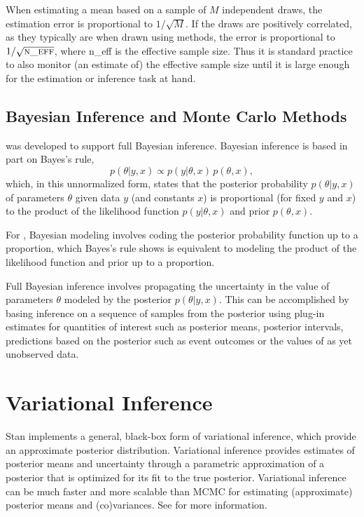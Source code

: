 When estimating a mean based on a sample of $M$ independent draws, the
estimation error is proportional to $1/\sqrt{M}$.  If the draws are
positively correlated, as they typically are when drawn using \MCMC
methods, the error is proportional to $1/\sqrt{\mbox{\sc n\_eff}}$,
where {\sc n\_eff} is the effective sample size.  Thus it is standard
practice to also monitor (an estimate of) the effective sample size
until it is large enough for the estimation or inference task at
hand.  

\subsection{Bayesian Inference and Monte Carlo Methods}

\Stan was developed to support full Bayesian inference.  Bayesian
inference is based in part on Bayes's rule,
\[
p(\theta|y,x) \propto p(y|\theta,x) \, p(\theta,x),
\]
which, in this unnormalized form, states that the posterior
probability $p(\theta|y,x)$ of parameters $\theta$ given data $y$ (and
constants $x$) is proportional (for fixed $y$ and $x$) to the
product of the likelihood function $p(y|\theta,x)$ and prior
$p(\theta,x)$.

For \Stan, Bayesian modeling involves coding the posterior probability
function up to a proportion, which Bayes's rule shows is equivalent to
modeling the product of the likelihood function and prior up to a
proportion.

Full Bayesian inference involves propagating the uncertainty in the
value of parameters $\theta$ modeled by the posterior $p(\theta|y,x)$.
This can be accomplished by basing inference on a sequence of samples
from the posterior using plug-in estimates for quantities of interest
such as posterior means, posterior intervals, predictions based on the
posterior such as event outcomes or the values of as yet unobserved
data.


\section{Variational Inference}

Stan implements a general, black-box form of variational inference,
which provide an approximate posterior distribution.  Variational
inference provides estimates of posterior means and uncertainty
through a parametric approximation of a posterior that is optimized
for its fit to the true posterior.  Variational inference can be much
faster and more scalable than MCMC for estimating (approximate)
posterior means and (co)variances.  See  for
more information.


